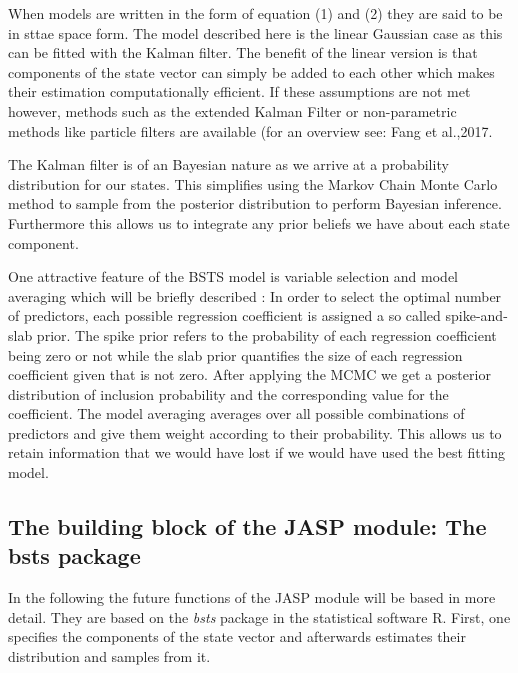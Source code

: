 \documentclass[a4paper, doc, natbib]{apa7}
\begin{document}
When models are written in the form of equation (1) and (2) they are said to be in sttae space form. The model described here is the linear Gaussian case as this can be fitted with the Kalman filter. The benefit of the linear version is that components of the state vector can simply be added to each other which makes their estimation computationally efficient\citep{fangNonlinearBayesianEstimation2017}. If these assumptions are not met however, methods such as the extended Kalman Filter or non-parametric methods like particle filters are available (for an overview see: Fang et al.,2017.

The Kalman filter is of an Bayesian nature as we arrive at a probability distribution for our states. This simplifies using the Markov Chain Monte Carlo method to sample from the posterior distribution to perform Bayesian inference. Furthermore this allows us to integrate any prior beliefs we have about each state component. 

One attractive feature of the BSTS model is variable selection and model averaging which will be briefly described \cite[see an extensive explanation see][]{scottPredictingPresentBayesian2014,scottBayesianVariableSelection2015} : In order to select the optimal number of predictors, each possible regression coefficient is assigned a so called spike-and-slab prior. The spike prior refers to the probability of each regression coefficient being zero or not while the slab prior quantifies the size of each regression coefficient given that is not zero. After applying the MCMC we get a posterior distribution of inclusion probability and the corresponding value for the coefficient. The model averaging averages over all possible combinations of predictors and give them weight according to their probability. This allows us to retain information that we would have lost if we would have used the best fitting model.

\subsection{The building block of the JASP module: The bsts package}

In the following the future functions of the JASP module will be based in more detail. They are based on the \textit{bsts} package \citep{scottBstsBayesianStructural2020} in the statistical software R\citep{rcoreteamLanguageEnvironmentStatistical2021}. First, one specifies the components of the state vector and afterwards estimates their distribution and samples from it. 
\end{document}
